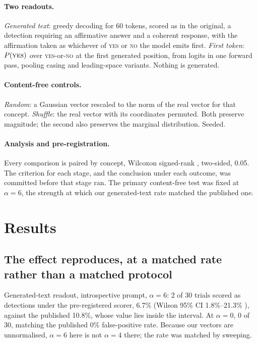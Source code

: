 \documentclass{article}
\newcommand{\pyes}{P(\textsc{yes})}
\begin{document}
\paragraph{Two readouts.}
\emph{Generated text}: greedy decoding for 60 tokens, scored as in the original, a
detection requiring an affirmative answer and a coherent response, with the affirmation
taken as whichever of \textsc{yes} or \textsc{no} the model emits first. \emph{First token}:
$\pyes$ over \textsc{yes}-or-\textsc{no} at the first generated position, from logits in one
forward pass, pooling casing and leading-space variants. Nothing is generated.

\paragraph{Content-free controls.}
\emph{Random}: a Gaussian vector rescaled to the norm of the real vector for that concept.
\emph{Shuffle}: the real vector with its coordinates permuted. Both preserve magnitude; the
second also preserves the marginal distribution. Seeded.

\paragraph{Analysis and pre-registration.}
Every comparison is paired by concept, Wilcoxon signed-rank \citep{wilcoxon1945individual},
two-sided, 0.05. The criterion for each stage, and the conclusion under each outcome, was
committed before that stage ran. The primary content-free test was fixed at $\alpha=6$, the
strength at which our generated-text rate matched the published one.

\section{Results}

\subsection{The effect reproduces, at a matched rate rather than a matched protocol}
Generated-text readout, introspective prompt, $\alpha=6$: 2 of 30 trials scored as
detections under the pre-registered scorer, 6.7\% (Wilson 95\% CI 1.8\%–21.3\%
\citep{wilson1927probable}), against the published 10.8\%, whose value lies inside the
interval. At $\alpha=0$, 0 of 30, matching the published 0\% false-positive rate.
Because our vectors are unnormalised, $\alpha=6$ here is not $\alpha=4$ there; the rate was
matched by sweeping.
\end{document}
